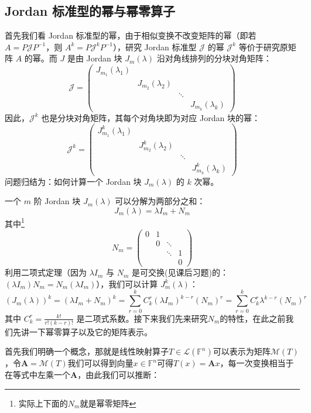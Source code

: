 \subsection{Jordan 标准型的幂与幂零算子}

首先我们看 Jordan 标准型的幂，由于相似变换不改变矩阵的幂（即若 $A = P\mathscr{J}P^{-1}$，则 $A^k = P\mathscr{J}^kP^{-1}$），研究 Jordan 标准型 $\mathscr{J}$ 的幂 $\mathscr{J}^k$ 等价于研究原矩阵 $A$ 的幂。而 $J$ 是由 Jordan 块 $J_m(\lambda)$ 沿对角线排列的分块对角矩阵：
$$
\mathscr{J} = \begin{pmatrix}
J_{m_1}(\lambda_1) & & \\
& J_{m_2}(\lambda_2) & \\
& & \ddots & \\
& & & J_{m_k}(\lambda_k)
\end{pmatrix}
$$因此，$\mathscr{J}^k$ 也是分块对角矩阵，其每个对角块即为对应 Jordan 块的幂：
$$
\mathscr{J}^k = \begin{pmatrix}
J_{m_1}^k(\lambda_1) & & \\
& J_{m_2}^k(\lambda_2) & \\
& & \ddots & \\
& & & J_{m_k}^k(\lambda_k)
\end{pmatrix}
$$问题归结为：如何计算一个 Jordan 块 $J_m(\lambda)$ 的 $k$ 次幂。

一个 $m$ 阶 Jordan 块 $J_m(\lambda)$ 可以分解为两部分之和：
$$
J_m(\lambda) = \lambda I_m + N_m
$$其中\footnote{实际上下面的$N_m$就是幂零矩阵}$$
    N_m = \begin{pmatrix}
    0 & 1 & & \\
    & 0 & \ddots & \\
    & & \ddots & 1 \\
    & & & 0
    \end{pmatrix}
    $$
利用二项式定理（因为 $\lambda I_m$ 与 $N_m$ 是可交换(见课后习题)的：$(\lambda I_m) N_m = N_m (\lambda I_m)$），我们可以计算 $J_m^k(\lambda)$：
$$
(J_m(\lambda))^k = (\lambda I_m + N_m)^k = \sum_{r=0}^{k} C_k^r (\lambda I_m)^{k-r} (N_m)^r = \sum_{r=0}^{k} C_k^r \lambda^{k-r} (N_m)^r
$$
其中 $\displaystyle C_k^r = \frac{k!}{r!(k-r)!}$ 是二项式系数。接下来我们先来研究$N_m$的特性，在此之前我们先讲一下幂零算子以及它的矩阵表示。

首先我们明确一个概念，那就是线性映射算子$T\in \mathcal{L}(\mathbb{F}^n)$可以表示为矩阵$\mathcal{M}(T)$，令$\mathbf{A}=\mathcal{M}(T)$我们可以得到向量$x\in \mathbb{F}^n$可得$T(x)=\mathbf{A}x$，每一次变换相当于在等式中左乘一个$\mathbf{A}$，由此我们可以推断：

